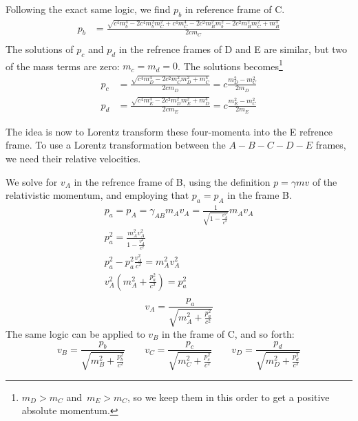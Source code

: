 \documentclass[12p,a4paper]{article}
\begin{document}
Following the exact same logic, we find $p_b$ in reference frame of C.
\begin{align*}
    p_b &= \frac{\sqrt{ c^4m_b^4 - 2c^4m_b^2m_C^2 + c^4m_C^4 - 2c^2m_B^2m_b^2 - 2c^2m_B^2 m_C^2 + m_B^4 }}{ 2cm_C } \\
\end{align*}
The solutions of $p_c$ and $p_d$ in the refrence frames of D and E are similar, but two of the mass terms are zero: $m_c = m_d = 0$. The solutions becomes\footnote{$m_D > m_C$ and $m_E > m_C$, so we keep them in this order to get a positive absolute momentum.}
\begin{align*}
    p_c &= \frac{\sqrt{c^4m_D^4 - 2c^2m_C^2 m_D^2 + m_C^4 }}{ 2cm_D } = c\frac{m_D^2 - m_C^2}{2m_D} \\
    p_d &= \frac{\sqrt{c^4m_E^4 - 2c^2m_D^2 m_E^2 + m_D^4 }}{ 2cm_E } = c\frac{m_E^2 - m_C^2}{2m_E}
\end{align*}

The idea is now to Lorentz transform these four-momenta into the E refrence frame. To use a Lorentz transformation between the $A-B-C-D-E$ frames, we need their relative velocities.

We solve for $v_A$ in the refrence frame of B, using the definition $p = \gamma m v$ of the relativistic momentum, and employing that $p_a = p_A$ in the frame B.
\begin{gather*}
    p_a = p_A = \gamma_{AB}m_A v_A = \frac{1}{\sqrt{1-\frac{v_A^2}{c^2}}} m_A v_A \\
    p_a^2 = \frac{m_A^2 v_A^2}{1-\frac{v_A^2}{c^2}} \\
    p_a^2 - p_a^2\frac{v_A^2}{c^2} = m_A^2v_A^2 \\
    v_A^2(m_A^2 + \frac{p_a^2}{c^2}) = p_a^2 \\
\end{gather*}
\begin{equation}
    v_A = \frac{p_a}{\sqrt{m_A^2 + \frac{p_a^2}{c^2}}}
\end{equation}
The same logic can be applied to $v_B$ in the frame of C, and so forth:
\begin{equation}
    v_B = \frac{p_b}{\sqrt{m_B^2 + \frac{p_b^2}{c^2}}} \quad\quad
    v_C = \frac{p_c}{\sqrt{m_C^2 + \frac{p_c^2}{c^2}}} \quad\quad
    v_D = \frac{p_d}{\sqrt{m_D^2 + \frac{p_d^2}{c^2}}}
\end{equation}
\end{document}
